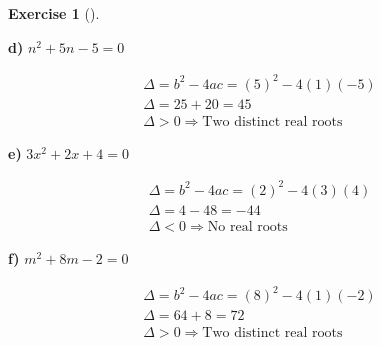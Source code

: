 \documentclass[
  letterpaper,
  DIV=11,
  numbers=noendperiod]{scrreprt}
\theoremstyle{definition}
\newtheorem{exercise}{Exercise}[chapter]
\theoremstyle{remark}
\begin{document}
\begin{exercise}[]
\begin{tcolorbox}
\textbf{d)} \(\displaystyle n^2 + 5n - 5 = 0\)

\begin{align*}
\Delta = b^2 - 4ac = (5)^2 - 4(1)(-5) \\ \Delta = 25 + 20 = 45 \\ \Delta > 0 \Rightarrow \text{Two distinct real roots}
\end{align*}

\textbf{e)} \(\displaystyle 3x^2 + 2x + 4 = 0\)

\begin{align*}
\Delta = b^2 - 4ac = (2)^2 - 4(3)(4) \\ \Delta = 4 - 48 = -44 \\ \Delta < 0 \Rightarrow \text{No real roots}
\end{align*}

\textbf{f)} \(\displaystyle m^2 + 8m - 2 = 0\)

\begin{align*}
\Delta = b^2 - 4ac = (8)^2 - 4(1)(-2) \\ \Delta = 64 + 8 = 72 \\ \Delta > 0 \Rightarrow \text{Two distinct real roots}
\end{align*}

\end{tcolorbox}

\end{exercise}
\end{document}
